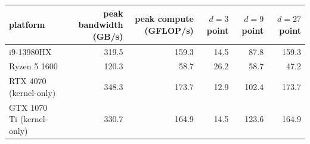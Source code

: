 \begin{tabular}{@{}lrrrrr@{}}
\toprule
platform & peak bandwidth (GB/s) & peak compute (GFLOP/s) & $d=3$ point & $d=9$ point & $d=27$ point \\
\midrule
i9-13980HX & 319.5 & 159.3 & 14.5 & 87.8 & 159.3 \\
Ryzen 5 1600 & 120.3 & 58.7 & 26.2 & 58.7 & 47.2 \\
RTX 4070 (kernel-only) & 348.3 & 173.7 & 12.9 & 102.4 & 173.7 \\
GTX 1070 Ti (kernel-only) & 330.7 & 164.9 & 14.5 & 123.6 & 164.9 \\
\bottomrule
\end{tabular}
